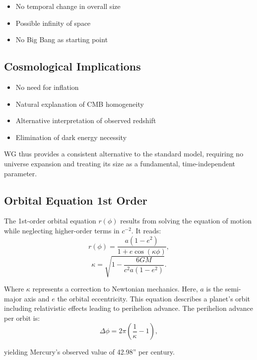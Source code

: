 \begin{itemize}
\item No temporal change in overall size
\item Possible infinity of space
\item No Big Bang as starting point
\end{itemize}

\subsection{Cosmological Implications}
\begin{itemize}
\item No need for inflation
\item Natural explanation of CMB homogeneity
\item Alternative interpretation of observed redshift
\item Elimination of dark energy necessity
\end{itemize}

WG thus provides a consistent alternative to the standard model, requiring no universe expansion and treating its size as a fundamental, time-independent parameter.


\subsection{Orbital Equation 1st Order}
The 1st-order orbital equation $r(\phi)$ results from solving the equation of motion while neglecting higher-order terms in $c^{-2}$. It reads:
\begin{equation}
    \label{eq:weber_r_1_ordnung}
    r(\phi) = \frac{a(1 - e^2)}{1 + e \cos(\kappa \phi)},    
\end{equation}
\begin{equation}
    \kappa = \sqrt{1 - \frac{6GM}{c^2 a(1 - e^2)}}.
\end{equation}

Where $\kappa$ represents a correction to Newtonian mechanics. Here, $a$ is the semi-major axis and $e$ the orbital eccentricity.
This equation describes a planet's orbit including relativistic effects leading to perihelion advance.
The perihelion advance per orbit is:
\begin{equation}
    \Delta \phi = 2\pi \left(\frac{1}{\kappa} - 1\right),
\end{equation}

yielding Mercury's observed value of 42.98'' per century.

